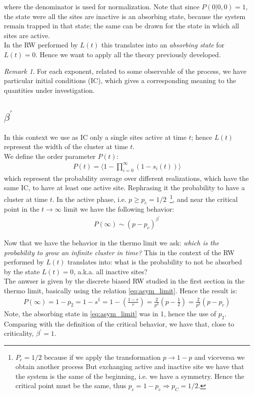 \documentclass[4apaper,11pt,fleqn]{article}
\theoremstyle{remark}
\newtheorem*{rem}{Remark}
\theoremstyle{definition}
\begin{document}
where the denominator is used for normalization. Note that since $P(0|0,0) = 1$, the state were all the sites are inactive is an absorbing state, because the system remain trapped in that state; the same can be drawn for the state in which all sites are active.\\
In the RW performed by $L(t)$ this translates into an \emph{absorbing state} for $L(t)=0$. Hence we want to apply all the theory previously developed.
\begin{rem}
  For each exponent, related to some observable of the process, we have particular initial conditions (IC), which gives a corresponding meaning to the quantities under investigation.
\end{rem}

\subsection{$\beta^\prime$}
In this context we use as IC only a single sites active at time $t$; hence $L(t)$ represent the width of the cluster at time $t$.\\
We define the order parameter $P(t)$:
\begin{align*}
  P(t) = \langle 1 - \prod_{i=0}^{\infty}(1-s_i(t)) \rangle
\end{align*}
which represent the probability average over different realizations, which have the same IC, to have at least one active site. Rephrasing it the probability to have a cluster at time $t$. In the active phase, i.e. $p \geq p_c = 1/2 $\, \footnote{$P_c=1/2$ because if we apply the transformation $ p \rightarrow 1-p $ and viceversa we obtain another process But exchanging active and inactive site we have that the system is the same of the beginning, i.e. we have a symmetry. Hence the critical point must be the same, thus $p_c=1-p_c \Rightarrow p_C=1/2$. }, and near the critical point in the $t \rightarrow \infty$ limit we have the following behavior:
\begin{align*}
  P(\infty) \sim (p-p_c)^{\beta^\prime}
\end{align*}

Now that we have the behavior in the thermo limit we ask: \emph{which is the probability to grow an infinite cluster in time?}
This in the context of the RW performed by $L(t)$ translates into: what is the probability to not be absorbed by the state $L(t)=0$, a.k.a. all inactive sites?\\
The anwser is given by the discrete biased RW studied in the first section in the thermo limit, basically using the relation \eqref{eq:asym_limit}. Hence the result is:
\begin{align*}
  P(\infty) = 1 - p_2 = 1 - s^1 = 1 - \left(  \frac{1-r}{r}  \right) = \frac{2}{p^2} \left( p - \frac{1}{2} \right) = \frac{2}{p^2} \left( p - p_c \right)
\end{align*}
Note, the absorbing state in \eqref{eq:asym_limit} was in 1, hence the use of $p_2$. Comparing with the definition of the critical behavior, we have that, close to criticality, $\beta^\prime = 1$.
\end{document}
